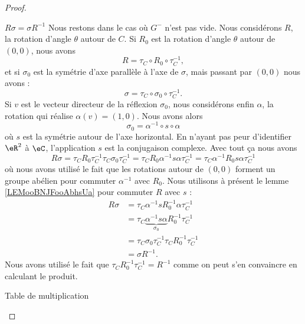 \begin{proof}
\begin{subproof}
\begin{subproof}
			\item[\( R\sigma = \sigma R^{-1}\)]
			Nous restons dans le cas où \( G^-\) n'est pas vide. Nous considérons \( R\), la rotation d'angle \( \theta\) autour de \( C\). Si \( R_0\) est la rotation d'angle \( \theta\) autour de \( (0,0)\), nous avons
			\begin{equation}
				R=\tau_C\circ R_0\circ \tau_C^{-1},
			\end{equation}
			et si \( \sigma_0\) est la symétrie d'axe parallèle à l'axe de \( \sigma\), mais passant par \( (0,0)\) nous avons :
			\begin{equation}
				\sigma=\tau_C\circ\sigma_0\circ\tau_C^{-1}.
			\end{equation}
			Si \( v\) est le vecteur directeur de la réflexion \( \sigma_0\), nous considérons enfin \( \alpha\), la rotation qui réalise \( \alpha(v)=(1,0)\). Nous avons alors
			\begin{equation}
				\sigma_0=\alpha^{-1}\circ s\circ \alpha
			\end{equation}
			où \( s\) est la symétrie autour de l'axe horizontal. En n'ayant pas peur d'identifier \( \eR^2\) à \( \eC\), l'application \( s\) est la conjugaison complexe. Avec tout ça nous avons
			\begin{equation}
				R\sigma=\tau_CR_0\tau_C^{-1}\tau_C\sigma_0\tau_C^{-1}=\tau_CR_0\alpha^{-1}s\alpha\tau_C^{-1}=\tau_C\alpha^{-1}R_0s\alpha\tau_C^{-1}
			\end{equation}
			où nous avons utilisé le fait que les rotations autour de \( (0,0)\) forment un groupe abélien pour commuter \( \alpha^{-1}\) avec \( R_0\). Nous utilisons à présent le lemme \ref{LEMooBNJFooAbhsUa} pour commuter \( R\) avec \( s\) :
			\begin{subequations}
				\begin{align}
					R\sigma & =\tau_C\alpha^{-1}sR_0^{-1}\alpha\tau_C^{-1}                          \\
					        & =\tau_C\underbrace{\alpha^{-1}s\alpha}_{\sigma_0} R_0^{-1}\tau_C^{-1} \\
					        & =\tau_C\sigma_0\tau_C^{-1}\tau_CR_0^{-1}\tau_C^{-1}                   \\
					        & =\sigma R^{-1}.
				\end{align}
			\end{subequations}
			Nous avons utilisé le fait que \( \tau_CR_0^{-1}\tau_C^{-1}=R^{-1}\) comme on peut s'en convaincre en calculant le produit.

			\item[Table de multiplication]


\end{subproof}
\end{subproof}
\end{proof}
